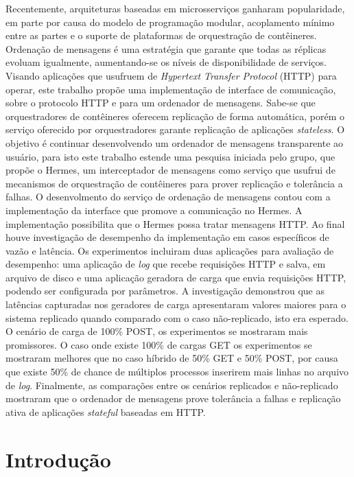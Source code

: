 \documentclass[12pt]{article}
\begin{document}
\begin{resumo} 
Recentemente, arquiteturas baseadas em microsserviços ganharam popularidade, em parte por causa do modelo de programação modular, acoplamento mínimo entre as partes e o suporte de plataformas de orquestração de contêineres. Ordenação de mensagens é uma estratégia que garante que todas as réplicas evoluam igualmente, aumentando-se os níveis de disponibilidade de serviços. Visando aplicações que usufruem de \textit{Hypertext Transfer Protocol} (HTTP) para operar, este trabalho propõe uma implementação de interface de comunicação, sobre o protocolo HTTP e para um ordenador de mensagens. Sabe-se que orquestradores de contêineres oferecem replicação de forma automática, porém o serviço oferecido por orquestradores garante replicação de aplicações \textit{stateless}. O objetivo é continuar desenvolvendo um ordenador de mensagens transparente ao usuário, para isto este trabalho estende uma pesquisa iniciada pelo grupo, que propõe o Hermes, um interceptador de mensagens como serviço que usufrui de mecanismos de orquestração de contêineres para prover replicação e tolerância a falhas. O desenvolmento do serviço de ordenação de mensagens contou com a implementação da interface que promove a comunicação no Hermes. A implementação possibilita que o Hermes possa tratar mensagens {HTTP}. Ao final houve investigação de desempenho da implementação em casos específicos de vazão e latência. Os experimentos incluiram duas aplicações para avaliação de desempenho: uma aplicação de \textit{log} que recebe requisições HTTP e salva, em arquivo de disco e uma aplicação geradora de carga que envia requisições HTTP, podendo ser configurada por parâmetros. A investigação demonstrou que as latências capturadas nos geradores de carga apresentaram valores maiores para o sistema replicado quando comparado com o caso não-replicado, isto era esperado. O cenário de carga de 100\% POST, os experimentos se mostraram mais promissores. O caso onde existe 100\% de cargas GET os experimentos se mostraram melhores que no caso híbrido de 50\% GET e 50\% POST, por causa que existe 50\% de chance de múltiplos processos inserirem mais linhas no arquivo de \textit{log}. Finalmente, as comparações entre os cenários replicados e não-replicado mostraram que o ordenador de mensagens prove tolerância a falhas e replicação ativa de aplicações \textit{stateful} baseadas em HTTP.
\end{resumo}

\section{Introdução}
\end{document}
